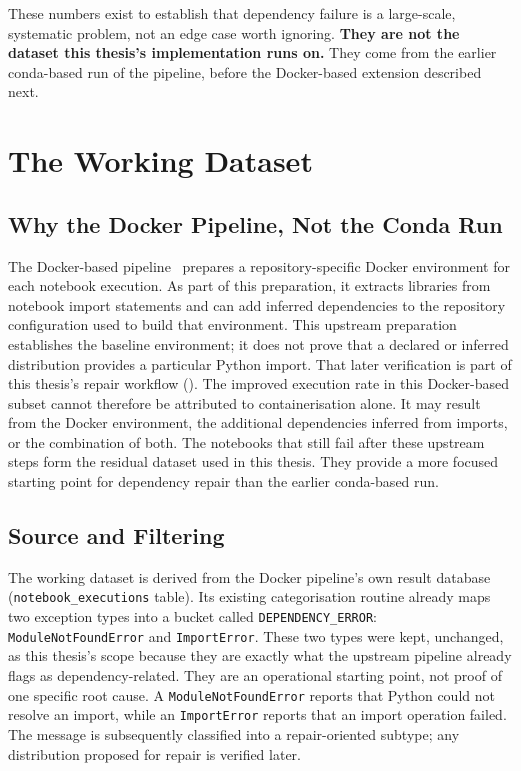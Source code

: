 These numbers exist to establish that dependency failure is a large-scale,
systematic problem, not an edge case worth ignoring. \textbf{They are not the
dataset this thesis's implementation runs on.} They come from the earlier
conda-based run of the pipeline, before the Docker-based extension described
next.

\section{The Working Dataset}
\label{sec:pd-i1}

\subsection{Why the Docker Pipeline, Not the Conda Run}
\label{sec:pd-why-docker}

The Docker-based pipeline~\cite{samuel2025docker} prepares a
repository-specific Docker environment for each notebook execution. As part of
this preparation, it extracts libraries from notebook import statements and
can add inferred dependencies to the repository configuration used to build
that environment. This upstream preparation establishes the baseline environment;
it does not prove that a declared or inferred distribution provides a
particular Python import. That later verification is part of this thesis's
repair workflow ().
The improved execution rate in this Docker-based subset cannot therefore be
attributed to containerisation alone. It may result from the Docker
environment, the additional dependencies inferred from imports, or the
combination of both. The notebooks that still fail after these upstream steps
form the residual dataset used in this thesis. They provide a more focused
starting point for dependency repair than the earlier conda-based run.

\subsection{Source and Filtering}
\label{sec:pd-source}

The working dataset is derived from the Docker pipeline's own result
database (\texttt{notebook\_executions} table). Its existing categorisation
routine already maps two exception types into a bucket called
\texttt{DEPENDENCY\_ERROR}: \texttt{ModuleNotFoundError} and
\texttt{ImportError}. These two types were kept, unchanged, as this thesis's
scope because they are exactly what the upstream pipeline already flags as
dependency-related. They are an operational starting point, not proof of one
specific root cause. A \texttt{ModuleNotFoundError} reports that Python could
not resolve an import, while an \texttt{ImportError} reports that an import
operation failed. The message is subsequently classified into a repair-oriented
subtype; any distribution proposed for repair is verified later.

